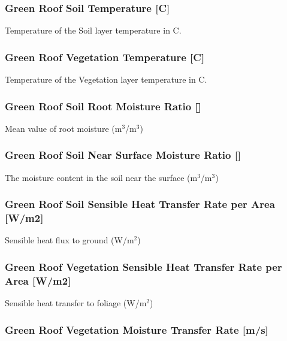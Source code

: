 \subsubsection{Green Roof Soil Temperature {[}C{]}}\label{green-roof-soil-temperature-c}

Temperature of the Soil layer temperature in C.

\subsubsection{Green Roof Vegetation Temperature {[}C{]}}\label{green-roof-vegetation-temperature-c}

Temperature of the Vegetation layer temperature in C.

\subsubsection{Green Roof Soil Root Moisture Ratio {[]}}\label{green-roof-soil-root-moisture-ratio}

Mean value of root moisture (m\(^{3}\)/m\(^{3}\))

\subsubsection{Green Roof Soil Near Surface Moisture Ratio {[]}}\label{green-roof-soil-near-surface-moisture-ratio}

The moisture content in the soil near the surface (m\(^{3}\)/m\(^{3}\))

\subsubsection{Green Roof Soil Sensible Heat Transfer Rate per Area {[}W/m2{]}}\label{green-roof-soil-sensible-heat-transfer-rate-per-area-wm2}

Sensible heat flux to ground (W/m\(^{2}\))

\subsubsection{Green Roof Vegetation Sensible Heat Transfer Rate per Area {[}W/m2{]}}\label{green-roof-vegetation-sensible-heat-transfer-rate-per-area-wm2}

Sensible heat transfer to foliage (W/m\(^{2}\))

\subsubsection{Green Roof Vegetation Moisture Transfer Rate {[}m/s{]}}\label{green-roof-vegetation-moisture-transfer-rate-ms}

